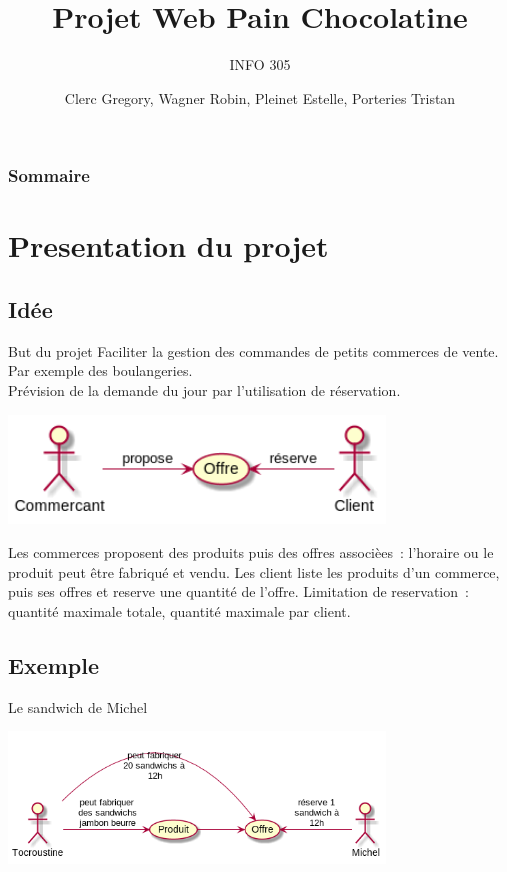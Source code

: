 \documentclass{beamer}
\title{Projet Web Pain Chocolatine}
\subtitle{INFO 305}
\author{Clerc Gregory, Wagner Robin, Pleinet Estelle, Porteries Tristan}
\begin{document}
\begin{frame}
  \titlepage
\end{frame}

\begin{frame}
    \frametitle{Sommaire}
    \begin{multicols}{2}
      {
        \tableofcontents
      }
    \end{multicols}
\end{frame}

\section{Presentation du projet}

\subsection{Idée}

\begin{frame}{But du projet}
	Faciliter la gestion des commandes de petits commerces de vente. Par exemple des boulangeries.\\
	Prévision de la demande du jour par l'utilisation de réservation.
	\begin{center}
		\includegraphics[width=10cm]{site_use.png}
	\end{center}
\end{frame}

\begin{frame}
	Les commerces proposent des produits puis des offres associèes~: l'horaire ou le produit peut être fabriqué et vendu.
	Les client liste les produits d'un commerce, puis ses offres et reserve une quantité de l'offre.
	\bigbreak
	Limitation de reservation~: quantité maximale totale, quantité maximale par client.
\end{frame}


\subsection{Exemple}

\begin{frame}{Le sandwich de Michel}
	\begin{center}
		\includegraphics[width=10cm]{site_exemple.png}
	\end{center}
\end{frame}
\end{document}
